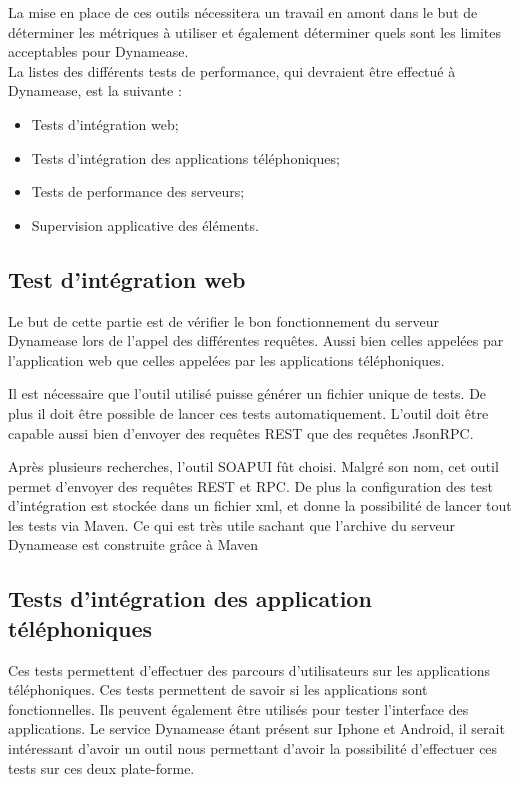 La mise en place de ces outils nécessitera un travail en amont dans le but de déterminer les métriques à utiliser et également déterminer quels sont les limites acceptables pour Dynamease.\\

La listes des différents tests de performance, qui devraient être effectué à Dynamease, est la suivante :

\begin{itemize}
	\item Tests d'intégration web;
	\item Tests d'intégration des applications téléphoniques;
	\item Tests de performance des serveurs;
	\item Supervision applicative des éléments.
\end{itemize}

\subsection{Test d'intégration web}

Le but de cette partie est de vérifier le bon fonctionnement du serveur Dynamease lors de l'appel des différentes requêtes. Aussi bien celles appelées par l'application web que celles appelées par les applications téléphoniques.

Il est nécessaire que l'outil utilisé puisse générer un fichier unique de tests. De plus il doit être possible de lancer ces tests automatiquement. L'outil doit être capable aussi bien d'envoyer des requêtes REST que des requêtes JsonRPC.

Après plusieurs recherches, l'outil SOAPUI fût choisi. Malgré son nom, cet outil permet d'envoyer des requêtes REST et RPC. De plus la configuration des test d'intégration est stockée dans un fichier xml, et donne la possibilité de lancer tout les tests via Maven. Ce qui est très utile sachant que l'archive du serveur Dynamease est construite grâce à Maven

\subsection{Tests d'intégration des application téléphoniques}

Ces tests permettent d'effectuer des parcours d'utilisateurs sur les applications téléphoniques. Ces tests permettent de savoir si les applications sont fonctionnelles. Ils peuvent également être utilisés pour tester l'interface des applications. Le service Dynamease étant présent sur Iphone et Android, il serait intéressant d'avoir un outil nous permettant d'avoir la possibilité d'effectuer ces tests sur ces deux plate-forme. 

